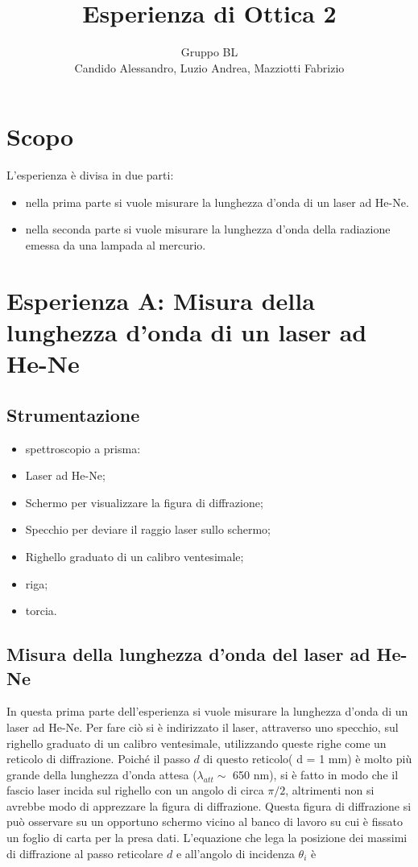 \documentclass[a4paper,10pt]{article}
\title{Esperienza di Ottica 2}
\author{Gruppo BL \\ Candido Alessandro, Luzio Andrea, Mazziotti Fabrizio}
\begin{document}
\maketitle

\section{Scopo}
L'esperienza è divisa in due parti:
\begin{itemize}
	\item nella prima parte si vuole misurare la lunghezza d'onda di un laser ad He-Ne.
	\item nella seconda parte si vuole misurare la lunghezza d'onda della radiazione emessa da una lampada al mercurio.
\end{itemize}

\section{Esperienza A: Misura della lunghezza d'onda di un laser ad He-Ne}

\subsection{Strumentazione}

\begin{itemize}
	\item spettroscopio a prisma:
	\item Laser ad He-Ne;
	\item Schermo per visualizzare la figura di diffrazione;
	\item Specchio per deviare il raggio laser sullo schermo;
	\item Righello graduato di un calibro ventesimale;
	\item riga;
	\item torcia.
\end{itemize}

\subsection{Misura della lunghezza d'onda del laser ad He-Ne}
In questa prima parte dell'esperienza si vuole misurare la lunghezza d'onda di un laser ad He-Ne. Per fare ciò si è indirizzato il laser, attraverso uno specchio, sul righello graduato di un calibro ventesimale, utilizzando queste righe come un reticolo di diffrazione. Poiché il passo $d$ di questo reticolo( d = 1 mm) è molto più grande della lunghezza d'onda attesa ($\lambda_{att} \sim$ 650 nm), si è fatto in modo che il fascio laser incida sul righello con un angolo di circa $\pi/2$, altrimenti non si avrebbe modo di apprezzare la figura di diffrazione.
Questa figura di diffrazione si può osservare su un opportuno schermo vicino al banco di lavoro su cui è fissato un foglio di carta per la presa dati.
L'equazione che lega la posizione dei massimi di diffrazione al passo reticolare $d$ e all'angolo di incidenza $\theta_i$ è
\end{document}
